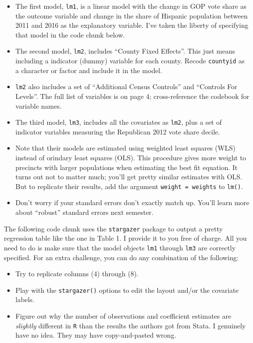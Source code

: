\documentclass[12pt,halfline,a4paper,]{ouparticle}
\providecommand{\tightlist}{%
  \setlength{\itemsep}{0pt}\setlength{\parskip}{0pt}}
\begin{document}
\begin{itemize}
\tightlist
\item
  The first model, \texttt{lm1}, is a linear model with the change in
  GOP vote share as the outcome variable and change in the share of
  Hispanic population between 2011 and 2016 as the explanatory variable.
  I've taken the liberty of specifying that model in the code chunk
  below.
\item
  The second model, \texttt{lm2}, includes ``County Fixed Effects''.
  This just means including a indicator (dummy) variable for each
  county. Recode \texttt{countyid} as a character or factor and include
  it in the model.
\item
  \texttt{lm2} also includes a set of ``Additional Census Controls'' and
  ``Controls For Levels''. The full list of variables is on page 4;
  cross-reference the codebook for variable names.
\item
  The third model, \texttt{lm3}, includes all the covariates as
  \texttt{lm2}, plus a set of indicator variables measuring the
  Republican 2012 vote share decile.
\item
  Note that their models are estimated using weighted least squares
  (WLS) instead of orindary least squares (OLS). This procedure gives
  more weight to precincts with larger populations when estimating the
  best fit equation. It turns out not to matter much; you'll get pretty
  similar estimates with OLS. But to replicate their results, add the
  argument \texttt{weight\ =\ weights} to \texttt{lm()}.
\item
  Don't worry if your standard errors don't exactly match up. You'll
  learn more about ``robust'' standard errors next semester.
\end{itemize}

The following code chunk uses the \texttt{stargazer} package to output a
pretty regression table like the one in Table 1. I provide it to you
free of charge. All you need to do is make sure that the model objects
\texttt{lm1} through \texttt{lm3} are correctly specified. For an extra
challenge, you can do any combination of the following:

\begin{itemize}
\tightlist
\item
  Try to replicate columns (4) through (8).
\item
  Play with the \texttt{stargazer()} options to edit the layout and/or
  the covariate labels.
\item
  Figure out why the number of observations and coefficient estimates
  are \emph{slightly} different in \texttt{R} than the results the
  authors got from Stata. I genuinely have no idea. They may have
  copy-and-pasted wrong.
\end{itemize}
\end{document}
